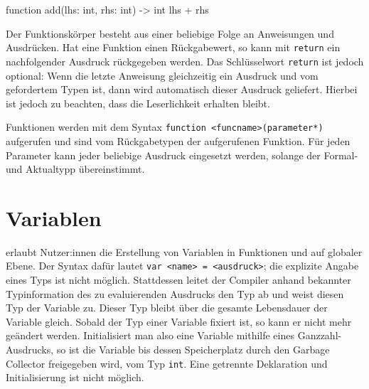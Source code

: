 \begin{ToyaCode}[numbers=none, caption={Eine typische Funktion unter toya.}]
function add(lhs: int, rhs: int) -> int {
    lhs + rhs
}
\end{ToyaCode}

Der Funktionskörper besteht aus einer beliebige Folge an Anweisungen und Ausdrücken. Hat eine Funktion einen Rückgabewert, so kann mit \texttt{return} ein nachfolgender Ausdruck rückgegeben werden. Das Schlüsselwort \texttt{return} ist jedoch optional: Wenn die letzte Anweisung gleichzeitig ein Ausdruck und vom gefordertem Typen ist, dann wird automatisch dieser Ausdruck geliefert. Hierbei ist jedoch zu beachten, dass die Leserlichkeit erhalten bleibt.

Funktionen werden mit dem Syntax \texttt{function <funcname>(parameter*)} aufgerufen und sind vom Rückgabetypen der aufgerufenen Funktion. Für jeden Parameter kann jeder beliebige Ausdruck eingesetzt werden, solange der Formal- und Aktualtypp übereinstimmt.


\section{Variablen}
\toya erlaubt Nutzer:innen die Erstellung von Variablen in Funktionen und auf globaler Ebene. Der Syntax dafür lautet \texttt{var <name> = <ausdruck>}; die explizite Angabe eines Typs ist nicht möglich. Stattdessen leitet der Compiler anhand bekannter Typinformation des zu evaluierenden Ausdrucks den Typ ab und weist diesen Typ der Variable zu. Dieser Typ bleibt über die gesamte Lebensdauer der Variable gleich. Sobald der Typ einer Variable fixiert ist, so kann er nicht mehr geändert werden. Initialisiert man also eine Variable mithilfe eines Ganzzahl-Ausdrucks, so ist die Variable bis dessen Speicherplatz durch den Garbage Collector freigegeben wird, vom Typ \texttt{int}. Eine getrennte Deklaration und Initialisierung ist nicht möglich.

